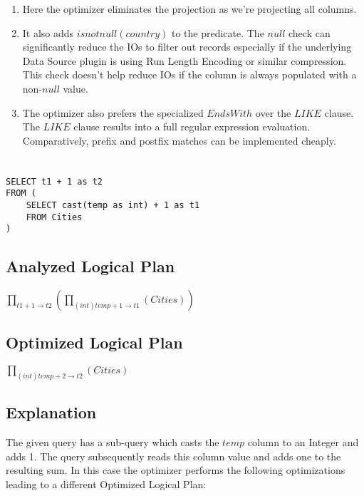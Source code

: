 \documentclass[12pt]{article}
\begin{document}
\begin{enumerate}


\item Here the optimizer eliminates the projection as we're projecting all columns. 

\item It also adds $isnotnull(country)$ to the predicate. The $null$ check can significantly reduce the IOs to filter out records especially if the underlying Data Source plugin is using Run Length Encoding or similar compression. This check doesn't help reduce IOs if the column is always populated with a non-$null$ value.

\item The optimizer also prefers the specialized $EndsWith$ over the $LIKE$ clause. The $LIKE$ clause results into a full regular expression evaluation. Comparatively, prefix and postfix matches can be implemented cheaply.
\end{enumerate}

\newpage

\section{}
\begin{verbatim}
SELECT t1 + 1 as t2
FROM (
    SELECT cast(temp as int) + 1 as t1
    FROM Cities
)
\end{verbatim}

\subsection*{Analyzed Logical Plan}
$\prod_{t1 + 1 \rightarrow t2} ( \prod_{(int)temp + 1 \rightarrow t1} (Cities) )$

\subsection*{Optimized Logical Plan}
$\prod_{(int)temp + 2 \rightarrow t2}(Cities)$

\subsection*{Explanation}

The given query has a sub-query which casts the $temp$ column to an Integer and adds 1. The query subsequently reads this column value and adds one to the resulting sum. In this case the optimizer performs the following optimizations leading to a different Optimized Logical Plan:
\end{document}
